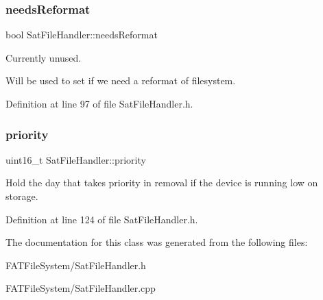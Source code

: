 \subsubsection{\texorpdfstring{needsReformat}{needsReformat}}
{\footnotesize\ttfamily bool Sat\+File\+Handler\+::needs\+Reformat\hspace{0.3cm}{\ttfamily [private]}}



Currently unused. 

Will be used to set if we need a reformat of filesystem. 

Definition at line 97 of file Sat\+File\+Handler.\+h.

\mbox{\label{class_sat_file_handler_ab7d2d4891d2de2fd472afab6af45dcba}} 
\subsubsection{\texorpdfstring{priority}{priority}}
{\footnotesize\ttfamily uint16\+\_\+t Sat\+File\+Handler\+::priority\hspace{0.3cm}{\ttfamily [private]}}



Hold the day that takes priority in removal if the device is running low on storage. 



Definition at line 124 of file Sat\+File\+Handler.\+h.



The documentation for this class was generated from the following files\+:\begin{DoxyCompactItemize}
\item 
F\+A\+T\+File\+System/Sat\+File\+Handler.\+h\item 
F\+A\+T\+File\+System/Sat\+File\+Handler.\+cpp\end{DoxyCompactItemize}
